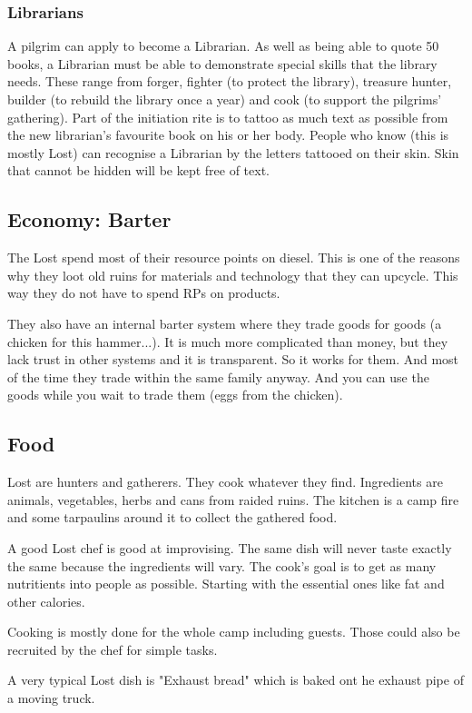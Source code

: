 \subsubsection{Librarians}

A pilgrim can apply to become a Librarian. As well as being able to quote 50 books, a Librarian must be able to demonstrate special skills that the library needs. These range from forger, fighter (to protect the library), treasure hunter, builder (to rebuild the library once a year) and cook (to support the pilgrims' gathering).
Part of the initiation rite is to tattoo as much text as possible from the new librarian's favourite book on his or her body. People who know (this is mostly Lost) can recognise a Librarian by the letters tattooed on their skin.
Skin that cannot be hidden will be kept free of text.

\subsection{Economy: Barter}
\label{sec:Barter}
The Lost spend most of their resource points on diesel. This is one of the reasons why they loot old ruins for materials and technology that they can upcycle. This way they do not have to spend RPs on products.

They also have an internal barter system where they trade goods for goods (a chicken for this hammer...).
It is much more complicated than money, but they lack trust in other systems and it is transparent. So it works for them. And most of the time they trade within the same family anyway.
And you can use the goods while you wait to trade them (eggs from the chicken).

\subsection{Food}
\label{sec: lost food}

Lost are hunters and gatherers. They cook whatever they find. Ingredients are animals, vegetables, herbs and cans from raided ruins. The kitchen is a camp fire and some tarpaulins around it to collect the gathered food.

A good Lost chef is good at improvising. The same dish will never taste exactly the same because the ingredients will vary. The cook's goal is to get as many nutritients into people as possible. Starting with the essential ones like fat and other calories.

Cooking is mostly done for the whole camp including guests. Those could also be recruited by the chef for simple tasks.

A very typical Lost dish is "Exhaust bread" which is baked ont he exhaust pipe of a moving truck.


